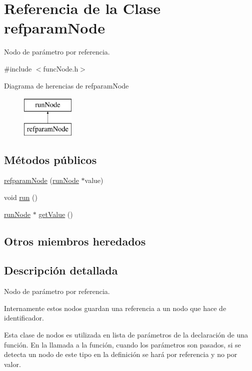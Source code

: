 \hypertarget{classrefparamNode}{\section{Referencia de la Clase refparam\-Node}
\label{classrefparamNode}
}


Nodo de parámetro por referencia.  




{\ttfamily \#include $<$func\-Node.\-h$>$}

Diagrama de herencias de refparam\-Node\begin{figure}[H]
\begin{center}
\leavevmode
\includegraphics[height=2.000000cm]{classrefparamNode}
\end{center}
\end{figure}
\subsection*{Métodos públicos}
\begin{DoxyCompactItemize}
\item 
\hyperlink{classrefparamNode_a9d26156b01e304bc7e8323f935a79648}{refparam\-Node} (\hyperlink{classrunNode}{run\-Node} $\ast$value)
\item 
void \hyperlink{classrefparamNode_aab9b41790c37b398dfc05794b05722b3}{run} ()
\item 
\hyperlink{classrunNode}{run\-Node} $\ast$ \hyperlink{classrefparamNode_ae004ff3cebf8ae785631341b0f453ff9}{get\-Value} ()
\end{DoxyCompactItemize}
\subsection*{Otros miembros heredados}


\subsection{Descripción detallada}
Nodo de parámetro por referencia. 

Internamente estos nodos guardan una referencia a un nodo que hace de identificador.

Esta clase de nodos es utilizada en lista de parámetros de la declaración de una función. En la llamada a la función, cuando los parámetros son pasados, si se detecta un nodo de este tipo en la definición se hará por referencia y no por valor. 

